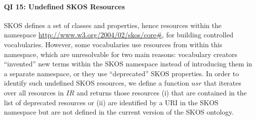 \paragraph{QI 15: Undefined SKOS Resources}

SKOS defines a set of classes and properties, hence resources within the namespace \url{http://www.w3.org/2004/02/skos/core#}, for building controlled vocabularies. However, some vocabularies use resources from within this namespace, which are unresolvable for two main reasons: vocabulary creators ``invented'' new terms within the SKOS namespace instead of introducing them in a separate namespace, or they use ``deprecated'' SKOS properties.
In order to identify such undefined SKOS resources, we define a function $usr$  that iterates over all resources in $IR$ and returns those resources (i) that are contained in the list of deprecated resources or (ii) are identified by a URI in the SKOS namespace but are not defined in the current version of the SKOS ontology.

